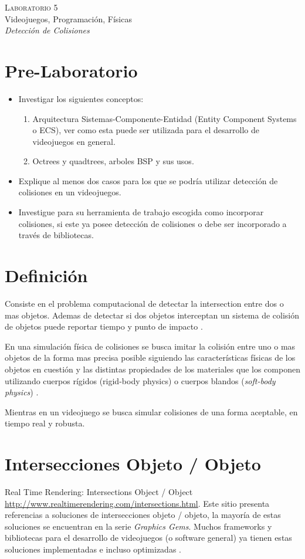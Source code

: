 \begin{center}
\textsc{\Large Laboratorio 5}~\\
{\large Videojuegos, Programación, Físicas}~\\
\emph{Detección de Colisiones}
\end{center}


\section{Pre-Laboratorio}
\begin{itemize}
\item Investigar los siguientes conceptos:
\begin{enumerate}
  \item Arquitectura Sistemas-Componente-Entidad (Entity Component Systems o ECS), ver como esta puede ser utilizada para el desarrollo de videojuegos en general.
  \item Octrees y quadtrees, arboles BSP y sus usos.
\end{enumerate}
\item Explique al menos dos casos para los que se podría utilizar detección de colisiones en un videojuegos.
\item Investigue para su herramienta de trabajo escogida como incorporar colisiones, si este ya posee detección de colisiones o debe ser incorporado a través de bibliotecas.
\end{itemize}

\section{Definición}
Consiste en el problema computacional de detectar la intersection entre dos o mas objetos. Ademas de detectar si dos objetos interceptan un sistema de colisión de objetos puede reportar tiempo y punto de impacto \cite{ericson_collision}.

En una simulación física de colisiones se busca imitar la colisión entre uno o mas objetos de la forma mas precisa posible siguiendo las características físicas de los objetos en cuestión y las distintas propiedades de los materiales que los componen utilizando cuerpos rígidos (rigid-body physics) o cuerpos blandos (\emph{soft-body physics}) \cite[p.~340]{jenkinscreatinggames}.

Mientras en un videojuego se busca simular colisiones de una forma aceptable, en tiempo real y robusta.

\section{Intersecciones Objeto / Objeto}
Real Time Rendering: Intersections Object / Object \url{http://www.realtimerendering.com/intersections.html}. Este sitio presenta referencias a soluciones de intersecciones objeto / objeto, la mayoría de estas soluciones se encuentran en la serie \emph{Graphics Gems}. Muchos frameworks y bibliotecas para el desarrollo de videojuegos (o software general) ya tienen estas soluciones implementadas e incluso optimizadas \cite{rtr_intersections}.
